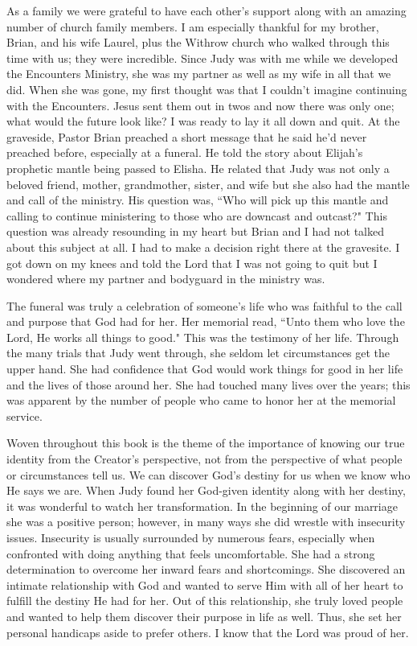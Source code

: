 \documentclass[oneside]{book}
\begin{document}
As a family we were grateful to have each other's support along with an amazing number of church family members. I am especially thankful for my brother, Brian, and his wife Laurel, plus the Withrow church who walked through this time with us; they were incredible. Since Judy was with me while we developed the Encounters Ministry, she was my partner as well as my wife in all that we did. When she was gone, my first thought was that I couldn't imagine continuing with the Encounters. Jesus sent them out in twos and now there was only one; what would the future look like? I was ready to lay it all down and quit. At the graveside, Pastor Brian preached a short message that he said he'd never preached before, especially at a funeral. He told the story about Elijah's prophetic mantle being passed to Elisha. He related that Judy was not only a beloved friend, mother, grandmother, sister, and wife but she also had the mantle and call of the ministry. His question was, ``Who will pick up this mantle and calling to continue ministering to those who are downcast and outcast?" This question was already resounding in my heart but Brian and I had not talked about this subject at all. I had to make a decision right there at the gravesite. I got down on my knees and told the Lord that I was not going to quit but I wondered where my partner and bodyguard in the ministry was.

The funeral was truly a celebration of someone's life who was faithful to the call and purpose that God had for her. Her memorial read, ``Unto them who love the Lord, He works all things to good." This was the testimony of her life. Through the many trials that Judy went through, she seldom let circumstances get the upper hand. She had confidence that God would work things for good in her life and the lives of those around her. She had touched many lives over the years; this was apparent by the number of people who came to honor her at the memorial service. 

Woven throughout this book is the theme of the importance of knowing our true identity from the Creator's perspective, not from the perspective of what people or circumstances tell us. We can discover God's destiny for us when we know who He says we are. When Judy found her God-given identity along with her destiny, it was wonderful to watch her transformation. In the beginning of our marriage she was a positive person; however, in many ways she did wrestle with insecurity issues. Insecurity is usually surrounded by numerous fears, especially when confronted with doing anything that feels uncomfortable. She had a strong determination to overcome her inward fears and shortcomings. She discovered an intimate relationship with God and wanted to serve Him with all of her heart to fulfill the destiny He had for her. Out of this relationship, she truly loved people and wanted to help them discover their purpose in life as well. Thus, she set her personal handicaps aside to prefer others. I know that the Lord was proud of her.
\end{document}
